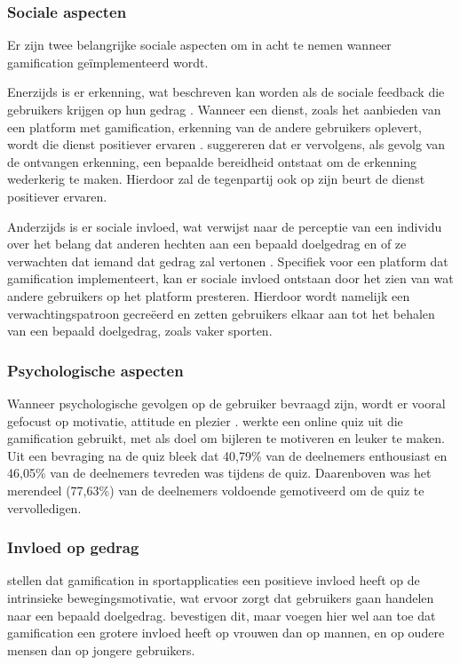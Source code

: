 \subsubsection{Sociale aspecten}
Er zijn twee belangrijke sociale aspecten om in acht te nemen wanneer gamification geïmplementeerd wordt.

Enerzijds is er erkenning, wat beschreven kan worden als de sociale feedback die gebruikers krijgen op hun gedrag \autocite{Cheung2011}.
Wanneer een dienst, zoals het aanbieden van een platform met gamification, erkenning van de andere gebruikers oplevert, wordt die dienst positiever ervaren \autocite{Preece2001}.
\textcite{Hamari2013} suggereren dat er vervolgens, als gevolg van de ontvangen erkenning, een bepaalde bereidheid ontstaat om de erkenning wederkerig te maken. Hierdoor zal de tegenpartij ook op zijn beurt de dienst positiever ervaren.

Anderzijds is er sociale invloed, wat verwijst naar de perceptie van een individu over het belang dat anderen hechten aan een bepaald doelgedrag en of ze verwachten dat iemand dat gedrag zal vertonen \autocite{Ajzen1991}. Specifiek voor een platform dat gamification implementeert, kan er sociale invloed ontstaan door het zien van wat andere gebruikers op het platform presteren. Hierdoor wordt namelijk een verwachtingspatroon gecreëerd en zetten gebruikers elkaar aan tot het behalen van een bepaald doelgedrag, zoals vaker sporten.

\subsubsection{Psychologische aspecten}

Wanneer psychologische gevolgen op de gebruiker bevraagd zijn, wordt er vooral gefocust op motivatie, attitude en plezier \autocite{Hamari2014}. \textcite{Cheong2013} werkte een online quiz uit die gamification gebruikt, met als doel om bijleren te motiveren en leuker te maken. Uit een bevraging  na de quiz bleek dat 40,79\% van de deelnemers enthousiast en 46,05\% van de deelnemers tevreden was tijdens de quiz. Daarenboven was het merendeel (77,63\%) van de deelnemers voldoende gemotiveerd om de quiz te vervolledigen.

\subsubsection{Invloed op gedrag}

\textcite{Kari2016} stellen dat gamification in sportapplicaties een positieve invloed heeft op de intrinsieke bewegingsmotivatie, wat ervoor zorgt dat gebruikers gaan handelen naar een bepaald doelgedrag. \textcite{PoloPena2020} bevestigen dit, maar voegen hier wel aan toe dat gamification een grotere invloed heeft op vrouwen dan op mannen, en op oudere mensen dan op jongere gebruikers.


